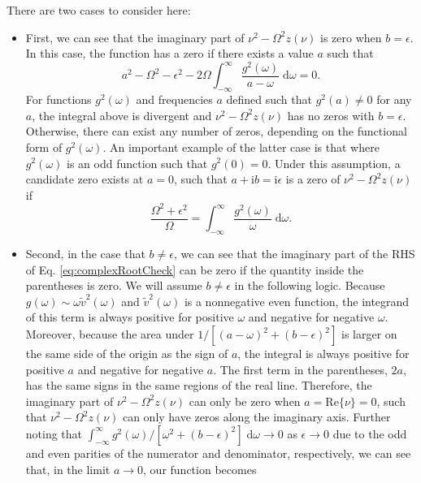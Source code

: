 There are two cases to consider here:
\begin{itemize}
    \item{
    First, we can see that the imaginary part of $\nu^2 - \Omega^2z(\nu)$ is zero when $b = \epsilon$. In this case, the function has a zero if there exists a value $a$ such that
    \begin{equation}
    a^2 - \Omega^2 - \epsilon^2 - 2\Omega\int_{-\infty}^\infty\frac{g^2(\omega)}{a - \omega}\;\mathrm{d}\omega = 0.
    \end{equation}
    For functions $g^2(\omega)$ and frequencies $a$ defined such that $g^2(a)\neq0$ for any $a$, the integral above is divergent and $\nu^2 - \Omega^2z(\nu)$ has no zeros with $b = \epsilon$. Otherwise, there can exist any number of zeros, depending on the functional form of $g^2(\omega)$. An important example of the latter case is that where $g^2(\omega)$ is an odd function such that $g^2(0) = 0$. Under this assumption, a candidate zero exists at $a = 0$, such that $a + \mathrm{i}b = \mathrm{i}\epsilon$ is a zero of $\nu^2 - \Omega^2z(\nu)$ if
    \begin{equation}
    \frac{\Omega^2 + \epsilon^2}{\Omega} = \int_{-\infty}^\infty\frac{g^2(\omega)}{\omega}\;\mathrm{d}\omega.
    \end{equation}
    }
    \item{
    Second, in the case that $b\neq\epsilon$, we can see that the imaginary part of the RHS of Eq. \eqref{eq:complexRootCheck} can be zero if the quantity inside the parentheses is zero. We will assume $b\neq\epsilon$ in the following logic. Because $g(\omega)\sim\omega\tilde{v}^2(\omega)$ and $\tilde{v}^2(\omega)$ is a nonnegative even function, the integrand of this term is always positive for positive $\omega$ and negative for negative $\omega$. Moreover, because the area under $1/[(a - \omega)^2 + (b - \epsilon)^2]$ is larger on the same side of the origin as the sign of $a$, the integral is always positive for positive $a$ and negative for negative $a$. The first term in the parentheses, $2a$, has the same signs in the same regions of the real line. Therefore, the imaginary part of $\nu^2 - \Omega^2z(\nu)$ can only be zero when $a = \mathrm{Re}\{\nu\} = 0$, such that $\nu^2 - \Omega^2z(\nu)$ can only have zeros along the imaginary axis. Further noting that $\int_{-\infty}^\infty g^2(\omega)/[\omega^2 + (b - \epsilon)^2]\;\mathrm{d}\omega \to 0$ as $\epsilon\to0$ due to the odd and even parities of the numerator and denominator, respectively, we can see that, in the limit $a\to0$, our function becomes
}
\end{itemize}
